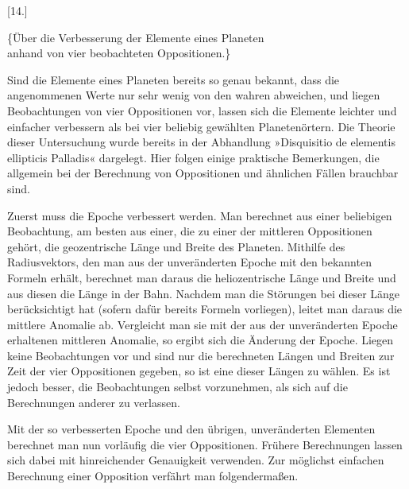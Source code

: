 \begin{center}
[14.]
\end{center}
\begin{center}
\{Über die Verbesserung der Elemente eines Planeten\\anhand von vier beobachteten Oppositionen.\}
\end{center}
Sind die Elemente eines Planeten bereits so genau bekannt, dass die angenommenen Werte nur sehr wenig von den wahren abweichen, und liegen Beobachtungen von vier Oppositionen vor, lassen sich die Elemente leichter und einfacher verbessern als bei vier beliebig gewählten Planetenörtern. Die Theorie dieser Untersuchung wurde bereits in der Abhandlung »Disquisitio de elementis ellipticis Palladis« dargelegt. Hier folgen einige praktische Bemerkungen, die allgemein bei der Berechnung von Oppositionen und ähnlichen Fällen brauchbar sind.

Zuerst muss die Epoche verbessert werden. Man berechnet aus einer beliebigen Beobachtung, am besten aus einer, die zu einer der mittleren Oppositionen gehört, die geozentrische Länge und Breite des Planeten. Mithilfe des Radiusvektors, den man aus der unveränderten Epoche mit den bekannten Formeln erhält, berechnet man daraus die heliozentrische Länge und Breite und aus diesen die Länge in der Bahn. Nachdem man die Störungen bei dieser Länge berücksichtigt hat (sofern dafür bereits Formeln vorliegen), leitet man daraus die mittlere Anomalie ab. Vergleicht man sie mit der aus der unveränderten Epoche erhaltenen mittleren Anomalie, so ergibt sich die Änderung der Epoche. Liegen keine Beobachtungen vor und sind nur die berechneten Längen und Breiten zur Zeit der vier Oppositionen gegeben, so ist eine dieser Längen zu wählen. Es ist jedoch besser, die Beobachtungen selbst vorzunehmen, als sich auf die Berechnungen anderer zu verlassen.

Mit der so verbesserten Epoche und den übrigen, unveränderten Elementen berechnet man nun vorläufig die vier Oppositionen. Frühere Berechnungen lassen sich dabei mit hinreichender Genauigkeit verwenden. Zur möglichst einfachen Berechnung einer Opposition verfährt man folgendermaßen.

